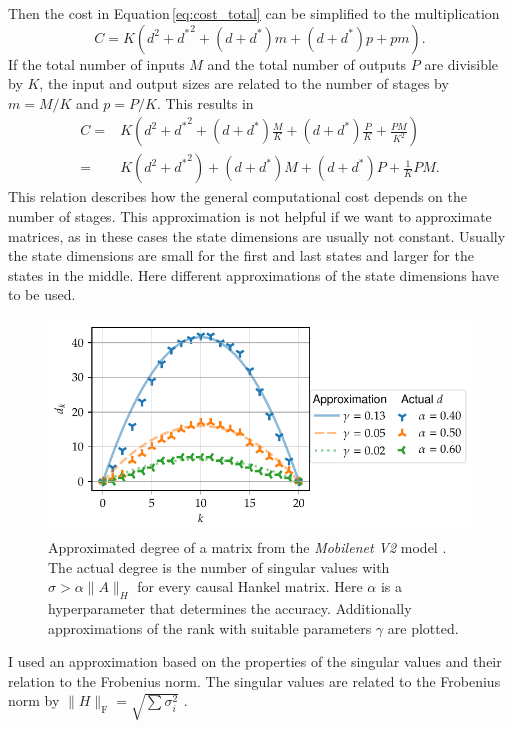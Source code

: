 \documentclass[numbers=noenddot,doctype=mastersthesis,BCOR=15mm,biblatex]{ldvbook}%
\newcommand{\da}{d^*} %
\begin{document}
Then the cost in Equation\,\ref{eq:cost_total} can be simplified to the multiplication
\begin{equation}
C = K(d^2 + {\da}^2 + (d+\da)m +(d+\da)p +pm) 
.
\end{equation}
If the total number of inputs $M$ and the total number of outputs $P$ are divisible by $K$, the input and output sizes are related to the number of stages by $m = M/K$ and $p=P/K$.
This results in
\begin{align}
C =& K(d^2 + {\da}^2 + (d+\da)\frac{M}{K} +(d+\da)\frac{P}{K} +\frac{PM}{K^2}) \\
=&
K(d^2 + {\da}^2) + (d+\da)M +(d+\da)P +\frac{1}{K}PM 
.
\end{align}
This relation describes how the general computational cost depends on the number of stages.
This approximation is not helpful if we want to approximate matrices, as in these cases the state dimensions are usually not constant.
Usually the state dimensions are small for the first and last states and larger for the states in the middle.
Here different approximations of the state dimensions have to be used.
\begin{figure}[htb]
	\centering
	\includegraphics[width=\textwidth]{Plots/approx_degree.pdf}
	\caption{Approximated degree of a matrix from the \emph{Mobilenet V2} model \cite{sandler_mobilenetv2_2019}.
		The actual degree is the number of singular values with $\sigma > \alpha \|A\|_H$ for every causal Hankel matrix. Here $\alpha$ is a hyperparameter that determines the accuracy.
		Additionally approximations of the rank with suitable parameters $\gamma$ are plotted.}
	\label{fig:approx_degree}
\end{figure}
I used an approximation based on the properties of the singular values and their relation to the Frobenius norm.
The singular values are related to the Frobenius norm by $\|H\|_\text{F} = \sqrt{\sum \sigma_i^2}$ \cite[p.~67]{bai_matrix_2021}.
\end{document}

